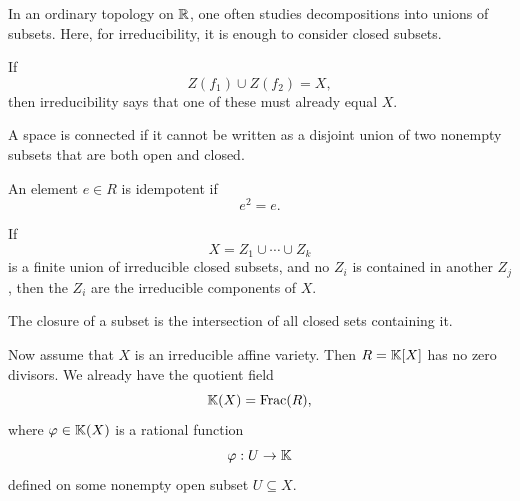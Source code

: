 \begin{remark}[Elaboration on (4)]
    In an ordinary topology on $\mathbb{R}$, one often studies decompositions into unions of subsets.
    Here, for irreducibility, it is enough to consider closed subsets.

    If
    \[
        Z(f_1)\cup Z(f_2) = X,
    \]
    then irreducibility says that one of these must already equal $X$.
\end{remark}

\begin{definition}[Connected]
    A space is connected if it cannot be written as a disjoint union of two nonempty subsets that are both open and closed.
\end{definition}

\begin{definition}[Idempotence]
    An element $e\in R$ is idempotent if
    \[
        e^2 = e.
    \]
\end{definition}

\begin{lemma*}{
    If
    \[
        X = Z_1\cup\cdots\cup Z_k
    \]
    is a finite union of irreducible closed subsets, and no $Z_i$ is contained in another $Z_j$, then the $Z_i$ are the irreducible components of $X$.
}
\end{lemma*}

\begin{definition}[Closure]
    The closure of a subset is the intersection of all closed sets containing it.
\end{definition}

Now assume that $X$ is an irreducible affine variety.
Then $R = \mathbb{K}[X]$ has no zero divisors.
We already have the quotient field
\[
    \mathbb{K}(X) = \mathrm{Frac}(R),
\]
where $\varphi\in \mathbb{K}(X)$ is a rational function
\[
    \varphi : U\to \mathbb{K}
\]
defined on some nonempty open subset $U\subseteq X$.

\begin{figure}[H]
    \centering


    \colorbox{white}{%
        \color{black}
    }
\end{figure}

